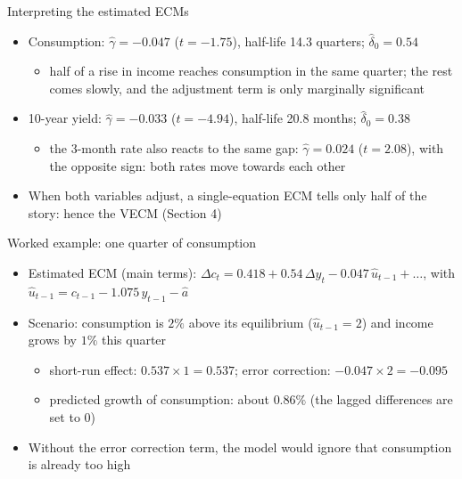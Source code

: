 \begin{frame}{Interpreting the estimated ECMs}
\itemsize{\small}
\begin{itemize}
    \item Consumption: $\hat\gamma = -0.047$ ($t = -1.75$), half-life 14.3 quarters; $\hat\delta_0 = 0.54$
    \begin{itemize}
        \item half of a rise in income reaches consumption in the same quarter; the rest comes slowly, and the adjustment term is only marginally significant
    \end{itemize}
    \item 10-year yield: $\hat\gamma = -0.033$ ($t = -4.94$), half-life 20.8 months; $\hat\delta_0 = 0.38$
    \begin{itemize}
        \item the 3-month rate also reacts to the same gap: $\hat\gamma = 0.024$ ($t = 2.08$), with the opposite sign: both rates move towards each other
    \end{itemize}
    \item When both variables adjust, a single-equation ECM tells only half of the story: hence the VECM (Section 4)
\end{itemize}
\end{frame}

\begin{frame}{Worked example: one quarter of consumption}
\itemsize{\small}
\begin{itemize}
    \item Estimated ECM (main terms): $\Delta c_t = 0.418 + 0.54\,\Delta y_t -0.047\,\hat u_{t-1} + \dots$, with $\hat u_{t-1} = c_{t-1} - 1.075\,y_{t-1} - \hat a$
    \item Scenario: consumption is $2\%$ above its equilibrium ($\hat u_{t-1} = 2$) and income grows by $1\%$ this quarter
    \begin{itemize}
        \item short-run effect: $0.537 \times 1 = 0.537$; error correction: $-0.047 \times 2 = -0.095$
        \item predicted growth of consumption: about $0.86\%$ (the lagged differences are set to 0)
    \end{itemize}
    \item Without the error correction term, the model would ignore that consumption is already too high
\end{itemize}
\end{frame}

